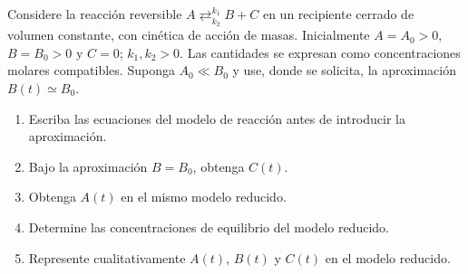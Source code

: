 Considere la reacción reversible $A\mathrel{\mathop{\rightleftarrows}^{k_1}_{k_2}}B+C$ en un recipiente cerrado de volumen constante, con cinética de acción de masas. Inicialmente $A=A_0>0$, $B=B_0>0$ y $C=0$; $k_1,k_2>0$. Las cantidades se expresan como concentraciones molares compatibles. Suponga $A_0\ll B_0$ y use, donde se solicita, la aproximación $B(t)\simeq B_0$.

\begin{enumerate}[label=(\alph*),ref=\alph*,leftmargin=*]
\item Escriba las ecuaciones del modelo de reacción antes de introducir la aproximación.
\item Bajo la aproximación $B=B_0$, obtenga $C(t)$.
\item Obtenga $A(t)$ en el mismo modelo reducido.
\item Determine las concentraciones de equilibrio del modelo reducido.
\item Represente cualitativamente $A(t)$, $B(t)$ y $C(t)$ en el modelo reducido.
\end{enumerate}
